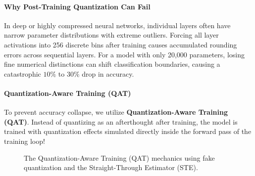 \paragraph{Why Post-Training Quantization Can Fail}
In deep or highly compressed neural networks, individual layers often have narrow parameter distributions with extreme outliers. Forcing all layer activations into 256 discrete bins after training causes accumulated rounding errors across sequential layers. For a model with only 20,000 parameters, losing fine numerical distinctions can shift classification boundaries, causing a catastrophic $10\%$ to $30\%$ drop in accuracy.

\paragraph{Quantization-Aware Training (QAT)}
To prevent accuracy collapse, we utilize \textbf{Quantization-Aware Training (QAT)}. Instead of quantizing as an afterthought after training, the model is trained with quantization effects simulated directly inside the forward pass of the training loop!

\begin{figure}[htbp]
\centering
{}
\caption{The Quantization-Aware Training (QAT) mechanics using fake quantization and the Straight-Through Estimator (STE).}\label{fig:qat_ste}
\end{figure}

